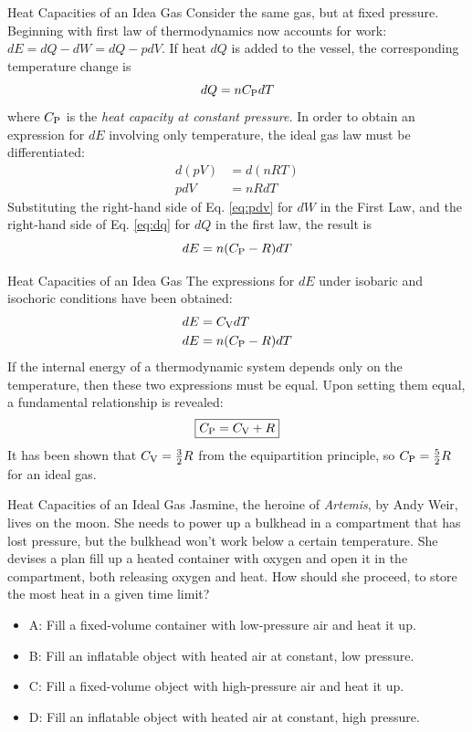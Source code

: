 \documentclass{beamer}
\begin{document}
\begin{frame}{Heat Capacities of an Idea Gas}
\small
Consider the same gas, but at fixed pressure.  Beginning with first law of thermodynamics now accounts for work: \\ $dE = dQ - dW = dQ - pdV$.  If heat $dQ$ is added to the vessel, the corresponding temperature change is
\begin{equation}
dQ = n C_{\rm P} dT \label{eq:dq}
\end{equation}
where $C_{\rm P}$ is the \textit{heat capacity at constant pressure.}  In order to obtain an expression for $dE$ involving only temperature, the ideal gas law must be differentiated:
\begin{align}
d(pV) &= d(nRT) \\
pdV &= nRdT \label{eq:pdv}
\end{align}
Substituting the right-hand side of Eq. \ref{eq:pdv} for $dW$ in the First Law, and the right-hand side of Eq. \ref{eq:dq} for $dQ$ in the first law, the result is
\begin{equation}
dE = n(C_{\rm P} - R)dT
\end{equation}
\end{frame}

\begin{frame}{Heat Capacities of an Idea Gas}
The expressions for $dE$ under isobaric and isochoric conditions have been obtained:
\begin{align}
dE &= C_{\rm V} dT \\
dE &= n(C_{\rm P} - R)dT
\end{align}
If the internal energy of a thermodynamic system depends only on the temperature, then these two expressions must be equal.  Upon setting them equal, a fundamental relationship is revealed:
\begin{equation}
\boxed{
C_{\rm P} = C_{\rm V} + R}
\end{equation}
It has been shown that $C_{\rm V} = \frac{3}{2}R$ from the equipartition principle, so $C_{\rm P} = \frac{5}{2}R$ for an ideal gas.
\end{frame}

\begin{frame}{Heat Capacities of an Ideal Gas}
\small
Jasmine, the heroine of \textit{Artemis}, by Andy Weir, lives on the moon.  She needs to power up a bulkhead in a compartment that has lost pressure, but the bulkhead won't work below a certain temperature.  She devises a plan fill up a heated container with oxygen and open it in the compartment, both releasing oxygen and heat.  How should she proceed, to store the most heat in a given time limit?
\begin{itemize}
\item A: Fill a fixed-volume container with low-pressure air and heat it up.
\item B: Fill an inflatable object with heated air at constant, low pressure.
\item C: Fill a fixed-volume object with high-pressure air and heat it up.
\item D: Fill an inflatable object with heated air at constant, high pressure.
\end{itemize}
\end{frame}
\end{document}
